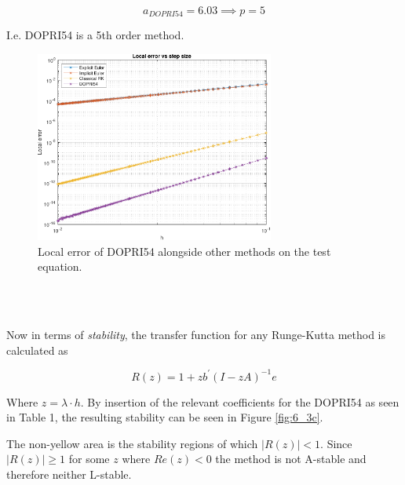 \begin{equation*}
    a_{DOPRI54} = 6.03 \implies p = 5 
\end{equation*}

I.e. DOPRI54 is a 5th order method.

\begin{figure}[H]
    \centering
    \includegraphics[width=0.7\textwidth]{plots/6_3b.pdf}
    \caption{Local error of DOPRI54 alongside other methods on the test equation.}
    \label{fig:6_3b}
\end{figure}

\\\

Now in terms of \textit{stability}, the transfer function for any Runge-Kutta method is calculated as 

\begin{equation}
R(z)=1+z b^{\prime}(I-z A)^{-1} e
\end{equation}

Where $z = \lambda \cdot h$. By insertion of the relevant coefficients for the DOPRI54 as seen in Table 1, the resulting stability can be seen in Figure \ref{fig:6_3c}.



The non-yellow area is the stability regions of which $|R(z)| < 1$. Since $|R(z)| \geq 1$ for some $z$ where $Re(z) < 0$ the method is not A-stable and therefore neither L-stable.

